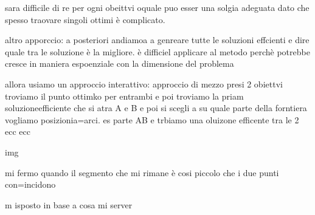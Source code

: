 sara difficile di re per ogni obeittvi oquale puo esser una solgia adeguata dato che spesso traovare singoli ottimi è complicato.




altro apporccio: a posteriori
andiamoa a genreare tutte le soluzioni effcienti e dire quale tra le soluzione è la migliore. è difficiel applicare al metodo perchè potrebbe cresce in maniera espoenziale con la dimensione del problema



allora usiamo un approccio interattivo:
approccio di mezzo
presi 2 obiettvi troviamo il punto ottimko per entrambi e poi troviamo la priam soluzioneefficiente che si atra A e B e poi si scegli a su quale parte della forntiera vogliamo posizionia=arci. es parte AB e trbiamo una oluizone efficente tra le 2 ecc ecc
 
img

mi fermo quando il segmento che mi rimane è cosi piccolo che i due punti con=incidono

m isposto in base a cosa mi server